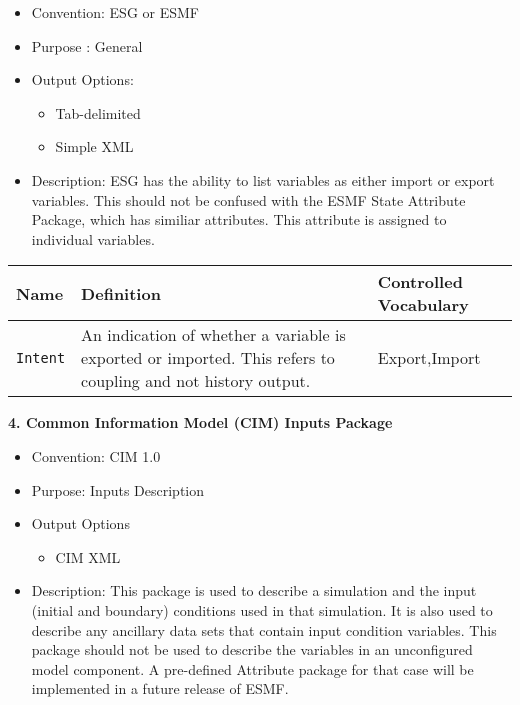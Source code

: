 \begin{itemize}
    \item Convention: ESG or ESMF
    \item Purpose : General
    \item Output Options: 
    \begin{itemize}
        \item Tab-delimited
        \item Simple XML
    \end{itemize}
    \item Description: ESG has the ability to list variables as either import or export variables. This should not be confused with the ESMF State Attribute Package, which has similiar attributes. This attribute is assigned to individual variables.  
\end{itemize}

\begin{tabular}{|p{8cm}|p{20cm}|p{10cm}|}
     {\bf Name } & {\bf Definition} & {\bf Controlled Vocabulary} \\
     \hline\hline
     {\tt Intent} & An indication of whether a variable is exported or imported. This refers to coupling and not history output. & Export,Import\\
\end{tabular}




\vspace{.20in}
{\bf 4. Common Information Model (CIM) Inputs Package}
\label{CIMFieldAttributePackages}

\begin{itemize}
    \item Convention: CIM 1.0
    \item Purpose: Inputs Description
    \item Output Options
    \begin{itemize}
        \item CIM XML 
    \end{itemize}
    \item Description: This package is used to describe a simulation and the input (initial and boundary) conditions used in that simulation. It is also used to describe any ancillary data sets that contain input condition variables. This package should not be used to describe the variables in an unconfigured model component. A pre-defined Attribute package for that case will be implemented in a future release of ESMF.    
\end{itemize}

